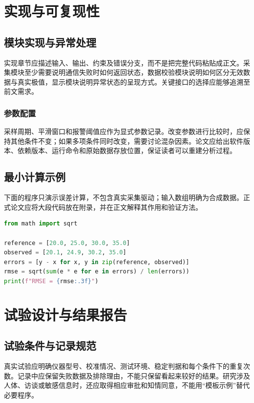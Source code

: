 \section{实现与可复现性}
\subsection{模块实现与异常处理}
实现章节应描述输入、输出、约束及错误分支，而不是把完整代码粘贴成正文。采集模块至少需要说明通信失败时如何返回状态，数据校验模块说明如何区分无效数据与真实极值，显示模块说明异常状态的呈现方式。关键接口的选择应能够追溯至前文需求。
\subsubsection{参数配置}
采样周期、平滑窗口和报警阈值应作为显式参数记录。改变参数进行比较时，应保持其他条件不变；如果多项条件同时改变，需要讨论混杂因素。论文应给出软件版本、依赖版本、运行命令和原始数据存放位置，保证读者可以重建分析过程。
\subsection{最小计算示例}
下面的程序只演示误差计算，不包含真实采集驱动；输入数组明确为合成数据。正式论文应将大段代码放在附录，并在正文解释其作用和验证方法。
\begin{lstlisting}[language=Python,caption={误差计算示例（输入为合成数据）}]
from math import sqrt

reference = [20.0, 25.0, 30.0, 35.0]
observed = [20.1, 24.9, 30.2, 35.0]
errors = [y - x for x, y in zip(reference, observed)]
rmse = sqrt(sum(e * e for e in errors) / len(errors))
print(f"RMSE = {rmse:.3f}")
\end{lstlisting}

\section{试验设计与结果报告}
\subsection{试验条件与记录规范}
真实试验应明确仪器型号、校准情况、测试环境、稳定判据和每个条件下的重复次数。记录中应保留失败数据及排除理由，不能只保留看起来较好的结果。研究涉及人体、访谈或敏感信息时，还应取得相应审批和知情同意，不能用“模板示例”替代必要程序。
